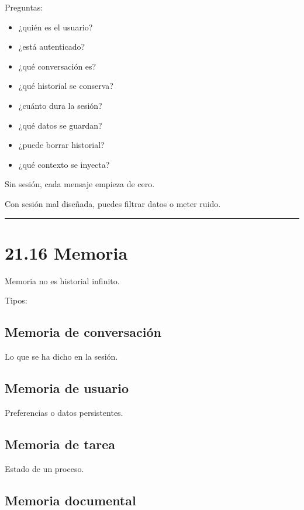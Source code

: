 Preguntas:

\begin{itemize}
\tightlist
\item
  ¿quién es el usuario?
\item
  ¿está autenticado?
\item
  ¿qué conversación es?
\item
  ¿qué historial se conserva?
\item
  ¿cuánto dura la sesión?
\item
  ¿qué datos se guardan?
\item
  ¿puede borrar historial?
\item
  ¿qué contexto se inyecta?
\end{itemize}

Sin sesión, cada mensaje empieza de cero.

Con sesión mal diseñada, puedes filtrar datos o meter ruido.

\begin{center}\rule{0.5\linewidth}{0.5pt}\end{center}

\section{21.16 Memoria}\label{memoria-2}

Memoria no es historial infinito.

Tipos:

\subsection{Memoria de conversación}\label{memoria-de-conversaciuxf3n-1}

Lo que se ha dicho en la sesión.

\subsection{Memoria de usuario}\label{memoria-de-usuario-1}

Preferencias o datos persistentes.

\subsection{Memoria de tarea}\label{memoria-de-tarea}

Estado de un proceso.

\subsection{Memoria documental}\label{memoria-documental}

